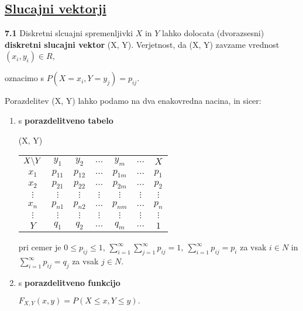\documentclass{article}
\begin{document}
\begin{multicols}{2}
	\section{\underline{Slucajni vektorji}}

	\textbf{7.1} Diskretni slcuajni spremenljivki $X$ in $Y$  lahko
	dolocata (dvorazsesni) \textbf{diskretni slucajni vektor} (X, Y).
	Verjetnost, da (X, Y) zavzame vrednost $(x_i, y_i) \in R$,

	\begin{center}
		oznacimo s $P(X = x_i, Y = y_j) = p_{ij}$.
	\end{center}

	Porazdelitev (X, Y) lahko podamo na dva enakovredna nacina, in sicer:

	\begin{enumerate}
		\item s \textbf{porazdelitveno tabelo}
		      \begin{center}
			      \begin{tiny}
				      (X, Y)
				      \begin{tabular}{ |c|c|c|c|c|c|c| }
					      \hline
					      $ X \symbol{92} Y $ & $y_1$    & $y_2$    & $\dots$  & $y_m$     & $\dots$  & $X$      \\
					      \cline{1-7}
					      $x_1$               & $p_{11}$ & $p_{12}$ & $\dots$  & $p_{1m}$  & $\dots$  & $p_1$    \\
					      $x_2$               & $p_{21}$ & $p_{22}$ & $\dots$  & $p_{2m}$  & $\dots$  & $p_2$    \\
					      $\vdots$            & $\vdots$ & $\vdots$ & $\vdots$ & $\vdots $ & $\vdots$ & $\vdots$ \\
					      $x_n$               & $p_{n1}$ & $p_{n2}$ & $\dots$  & $p_{nm}$  & $\dots$  & $p_n$    \\
					      $\vdots$            & $\vdots$ & $\vdots$ & $\vdots$ & $\vdots $ & $\vdots$ & $\vdots$ \\
					      \cline{1-7}
					      $ Y $               & $q_1$    & $q_2$    & $\dots$  & $q_m$     & $\dots$  & $1$      \\
					      \hline
				      \end{tabular}
			      \end{tiny}
		      \end{center}
		      pri cemer je $0 \leq p_{ij} \leq 1$,
		      \begin{math}
			      \sum_{i = 1}^{\infty} \sum_{j = 1}^{\infty} p_{ij} = 1,\:
			      \sum_{i = 1}^{\infty} p_{ij} = p_i
		      \end{math} za vsak $i \in N$ in
		      \begin{math}
			      \sum_{i = 1}^{\infty} p_{ij} = q_j
		      \end{math} za vsak $j \in N$.
		\item s \textbf{porazdelitveno funkcijo}
		      \begin{center}
			      \begin{math}
				      F_{X,Y}(x, y) = P(X \leq x, Y \leq y).
			      \end{math}


\end{center}
\end{enumerate}
\end{multicols}
\end{document}

